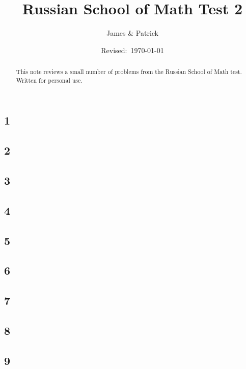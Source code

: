 \documentclass[12pt]{article}
\title{Russian School of Math Test 2}
\author{James \& Patrick}
\date{Revised:~\today}
\newif\ifsolution\solutiontrue%
\newif\ifanswer\answertrue%
\begin{document}
\maketitle
\begin{abstract}\setlength{\parindent}{0pt}%
This note reviews a small number of problems from the Russian School of Math test. Written for personal use.
\end{abstract}

\thispagestyle{empty}
\clearpage

\subsection*{1}

\ifsolution
  
\fi

\subsection*{2}


\subsection*{3}


\subsection*{4}


\subsection*{5}


\subsection*{6}


\subsection*{7}


\subsection*{8}


\subsection*{9}

\end{document}
